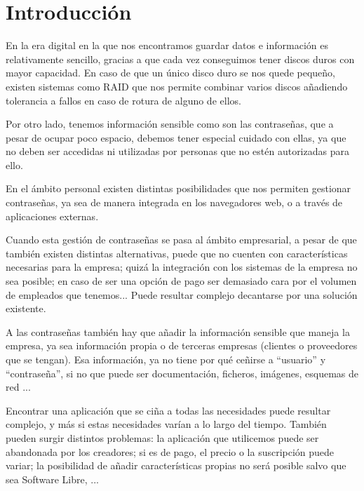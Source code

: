 \documentclass{\ClassPath/viu-tfm-template}
\begin{document}


\tableofcontents

\chapter{Introducción}
En la era digital en la que nos encontramos guardar datos e información es relativamente sencillo, gracias a que cada vez conseguimos tener discos duros con mayor capacidad. En caso de que un único disco duro se nos quede pequeño, existen sistemas como RAID que nos permite combinar varios discos añadiendo tolerancia a fallos en caso de rotura de alguno de ellos.

Por otro lado, tenemos información sensible como son las contraseñas, que a pesar de ocupar poco espacio, debemos tener especial cuidado con ellas, ya que no deben ser accedidas ni utilizadas por personas que no estén autorizadas para ello.

En el ámbito personal existen distintas posibilidades que nos permiten gestionar contraseñas, ya sea de manera integrada en los navegadores web, o a través de aplicaciones externas.

Cuando esta gestión de contraseñas se pasa al ámbito empresarial, a pesar de que también existen distintas alternativas, puede que no cuenten con características necesarias para la empresa; quizá la integración con los sistemas de la empresa no sea posible; en caso de ser una opción de pago ser demasiado cara por el volumen de empleados que tenemos... Puede resultar complejo decantarse por una solución existente.

A las contraseñas también hay que añadir la información sensible que maneja la empresa, ya sea información propia o de terceras empresas (clientes o proveedores que se tengan). Esa información, ya no tiene por qué ceñirse a “usuario” y “contraseña”, si no que puede ser documentación, ficheros, imágenes, esquemas de red ...

Encontrar una aplicación que se ciña a todas las necesidades puede resultar complejo, y más si estas necesidades varían a lo largo del tiempo. También pueden surgir distintos problemas: la aplicación que utilicemos puede ser abandonada por los creadores; si es de pago, el precio o la suscripción puede variar; la posibilidad de añadir características propias no será posible salvo que sea Software Libre, ...
\end{document}
